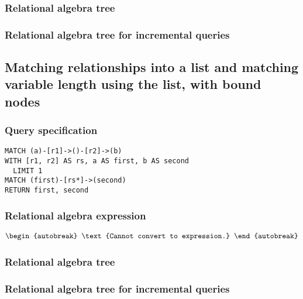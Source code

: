 \subsubsection*{Relational algebra tree}


\subsubsection*{Relational algebra tree for incremental queries}


\subsection{Matching relationships into a list and matching variable length using the list, with bound nodes}

\subsubsection*{Query specification}

\begin{lstlisting}
MATCH (a)-[r1]->()-[r2]->(b)
WITH [r1, r2] AS rs, a AS first, b AS second
  LIMIT 1
MATCH (first)-[rs*]->(second)
RETURN first, second
\end{lstlisting}

\subsubsection*{Relational algebra expression}

\begin{align*}
\begin{autobreak}
\text{Cannot convert to expression.}
\end{autobreak}
\end{align*}

\subsubsection*{Relational algebra tree}


\subsubsection*{Relational algebra tree for incremental queries}

